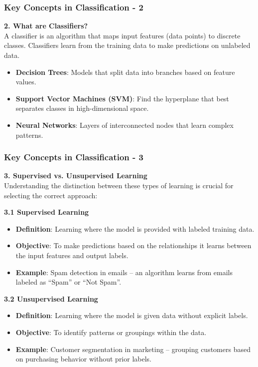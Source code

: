 \documentclass[aspectratio=169]{beamer}
\begin{document}
\begin{frame}[fragile]
    \frametitle{Key Concepts in Classification - 2}
    \textbf{2. What are Classifiers?} \\
    A classifier is an algorithm that maps input features (data points) to discrete classes. Classifiers learn from the training data to make predictions on unlabeled data.

    \begin{itemize}
        \item \textbf{Decision Trees}: Models that split data into branches based on feature values.
        \item \textbf{Support Vector Machines (SVM)}: Find the hyperplane that best separates classes in high-dimensional space.
        \item \textbf{Neural Networks}: Layers of interconnected nodes that learn complex patterns.
    \end{itemize}
\end{frame}

\begin{frame}[fragile]
    \frametitle{Key Concepts in Classification - 3}
    \textbf{3. Supervised vs. Unsupervised Learning} \\
    Understanding the distinction between these types of learning is crucial for selecting the correct approach:

    \textbf{3.1 Supervised Learning}
    \begin{itemize}
        \item \textbf{Definition}: Learning where the model is provided with labeled training data.
        \item \textbf{Objective}: To make predictions based on the relationships it learns between the input features and output labels.
        \item \textbf{Example}: Spam detection in emails – an algorithm learns from emails labeled as “Spam” or “Not Spam”.
    \end{itemize}

    \textbf{3.2 Unsupervised Learning}
    \begin{itemize}
        \item \textbf{Definition}: Learning where the model is given data without explicit labels.
        \item \textbf{Objective}: To identify patterns or groupings within the data.
        \item \textbf{Example}: Customer segmentation in marketing – grouping customers based on purchasing behavior without prior labels.
    \end{itemize}
\end{frame}
\end{document}
